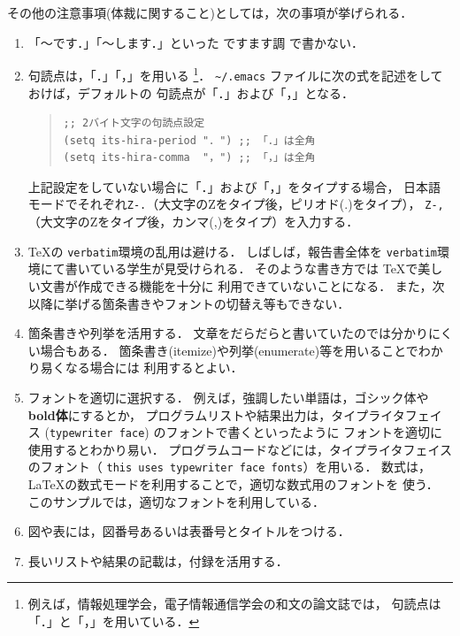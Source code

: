 \documentclass{jarticle}[11pt]
\begin{document}
その他の注意事項(体裁に関すること)としては，次の事項が挙げられる．
\begin{enumerate}
\item 「〜です．」「〜します．」といった {\gt ですます調} で書かない．

\item 句読点は，「．」「，」を用いる
\footnote{例えば，情報処理学会，電子情報通信学会の和文の論文誌では，
句読点は「．」と「，」を用いている．}．
\verb|~/.emacs| ファイルに次の式を記述をしておけば，デフォルトの
句読点が「．」および「，」となる．
%
\begin{quote}
\begin{verbatim}
;; 2バイト文字の句読点設定 
(setq its-hira-period "．") ;; 「．」は全角
(setq its-hira-comma  "，") ;; 「，」は全角
\end{verbatim}
\end{quote}
上記設定をしていない場合に「．」および「，」をタイプする場合，
日本語モードでそれぞれ\verb|Z-.|（大文字のZをタイプ後，ピリオド(.)をタイプ），
\verb|Z-,|（大文字のZをタイプ後，カンマ(,)をタイプ）を入力する．

\item \TeX の \verb|verbatim|環境の乱用は避ける．
しばしば，報告書全体を \verb|verbatim|環境にて書いている学生が見受けられる．
そのような書き方では \TeX で美しい文書が作成できる機能を十分に
利用できていないことになる．
また，次以降に挙げる箇条書きやフォントの切替え等もできない．

\item 箇条書きや列挙を活用する．
文章をだらだらと書いていたのでは分かりにくい場合もある．
箇条書き(itemize)や列挙(enumerate)等を用いることでわかり易くなる場合には
利用するとよい．
\item フォントを適切に選択する．
例えば，強調したい単語は，{\gt ゴシック体}や{\gt \bf bold体}にするとか，
プログラムリストや結果出力は，タイプライタフェイス
(\verb|typewriter face|) のフォントで書くといったように
フォントを適切に使用するとわかり易い．
プログラムコードなどには，タイプライタフェイスのフォント（
\verb|this uses typewriter face fonts|）を用いる．
数式は，\LaTeX の数式モードを利用することで，適切な数式用のフォントを
使う．
このサンプルでは，適切なフォントを利用している．
\item 図や表には，図番号あるいは表番号とタイトルをつける．
\item 長いリストや結果の記載は，付録を活用する．
\end{enumerate}
\end{document}
